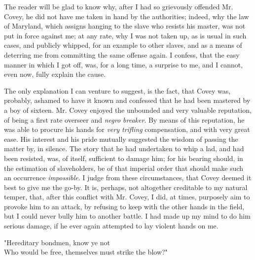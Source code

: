 The reader will be glad to know why, after I had
{\protect\hypertarget{248}{}{}}so grievously offended Mr. Covey, he did
not have me taken in hand by the authorities; indeed, why the law of
Maryland, which assigns hanging to the slave who resists his master, was
not put in force against me; at any rate, why I was not taken up, as is
usual in such cases, and publicly whipped, for an example to other
slaves, and as a means of deterring me from committing the same offense
again. I confess, that the easy manner in which I got off, was, for a
long time, a surprise to me, and I cannot, even now, fully explain the
cause.

The only explanation I can venture to suggest, is the fact, that Covey
was, probably, ashamed to have it known and confessed that he had been
mastered by a boy of sixteen. Mr. Covey enjoyed the unbounded and very
valuable reputation, of being a first rate overseer and \emph{negro
breaker}. By means of this reputation, he was able to procure his hands
for \emph{very trifling} compensation, and with very great ease. His
interest and his pride mutually suggested the wisdom of passing the
matter by, in silence. The story that he had undertaken to whip a lad,
and had been resisted, was, of itself, sufficient to damage him; for his
bearing should, in the estimation of slaveholders, be of that imperial
order that should make such an occurrence \emph{impossible}. I judge
from these circumstances, that Covey deemed it best to give me the
go-by. It is, perhaps, not altogether creditable to my natural temper,
that, after this conflict with Mr. Covey, I did, at times, purposely aim
to provoke him to an attack, by refusing to keep with the other hands in
the field, {\protect\hypertarget{249}{}{}}but I could never bully him to
another battle. I had made up my mind to do him serious damage, if he
ever again attempted to lay violent hands on me.

{"}Hereditary bondmen, know ye not\\
Who would be free, themselves must strike the blow?"
